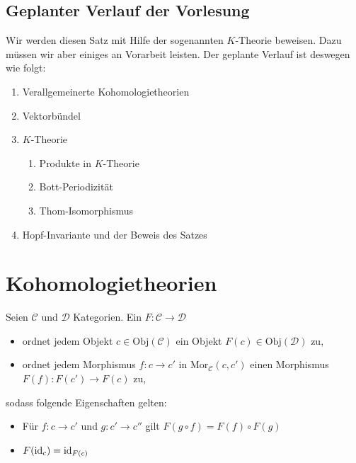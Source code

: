 
\subsection*{Geplanter Verlauf der Vorlesung} %
Wir werden diesen Satz mit Hilfe der sogenannten $K$-Theorie beweisen. Dazu müssen wir aber einiges an Vorarbeit leisten. Der geplante Verlauf ist deswegen wie folgt:
\begin{enumerate}[1.]
	\item Verallgemeinerte Kohomologietheorien
	\item Vektorbündel
	\item $K$-Theorie
	\begin{enumerate}[label*=\arabic*.]
		\item Produkte in $K$-Theorie
		\item Bott-Periodizität
		\item Thom-Isomorphismus
	\end{enumerate}
	\item Hopf-Invariante und der Beweis des Satzes
\end{enumerate}
\newpage

\section{Kohomologietheorien} %
\label{sec:1}

\begin{definition}[{name=[Kontravarianter Funktor]}]
Seien $\mathcal{C}$ und $\mathcal{D}$ Kategorien. Ein  $F \colon \mathcal{C} \to \mathcal{D}$ 
\begin{itemize}
	\item ordnet jedem Objekt $c \in \mathrm{Obj}(\mathcal{C})$ ein Objekt $F(c) \in \mathrm{Obj}(\mathcal{D})$ zu,
	\item ordnet jedem Morphismus $f \colon c \to c'$ in $\mathrm{Mor}_{\mathcal{C}}(c,c')$ einen Morphismus $F(f) \colon F(c') \to F(c)$ zu,
\end{itemize}
sodass folgende Eigenschaften gelten:
\begin{itemize}
	\item Für $f \colon c \to c'$ und $g \colon c' \to c''$ gilt $F(g \circ f) = F(f) \circ F(g)$
	\item $F(\operatorname{id}_c) = \operatorname{id}_{F(c)}$
\end{itemize}
\end{definition}

